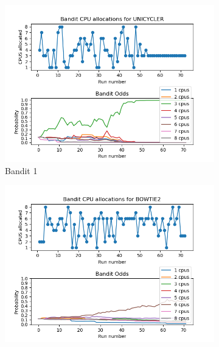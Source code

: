\begin{figure}[ht]
\centering
\begin{subfigure}{.5\textwidth}
  \includegraphics[width=1.1\textwidth,height=1.1\textwidth]{fig/UNICYCLER.png}
  \caption{Bandit 1}
\end{subfigure}%
\begin{subfigure}{.5\textwidth}
  \includegraphics[width=1.1\textwidth,height=1.1\textwidth]{fig/BOWTIE2.png}

\end{subfigure}
\end{figure}
